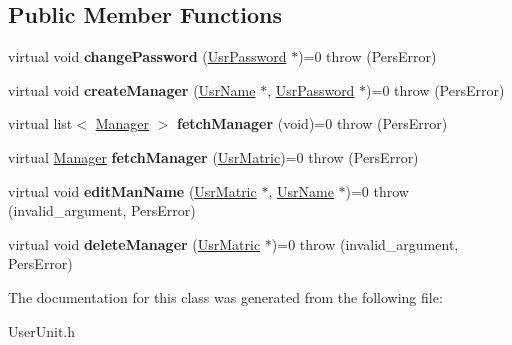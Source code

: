 \subsection*{Public Member Functions}
\begin{DoxyCompactItemize}
\item 
\hypertarget{classUserManAdm_a75006ea396a6384bbf47918fe9316bce}{virtual void {\bfseries change\-Password} (\hyperlink{classUsrPassword}{Usr\-Password} $\ast$)=0  throw (\-Pers\-Error)}\label{da/d86/classUserManAdm_a75006ea396a6384bbf47918fe9316bce}

\item 
\hypertarget{classUserManAdm_a4c1d61e8190867eb786cdf97083ba289}{virtual void {\bfseries create\-Manager} (\hyperlink{classUsrName}{Usr\-Name} $\ast$, \hyperlink{classUsrPassword}{Usr\-Password} $\ast$)=0  throw (\-Pers\-Error)}\label{da/d86/classUserManAdm_a4c1d61e8190867eb786cdf97083ba289}

\item 
\hypertarget{classUserManAdm_a05b8b4f5b1e42b7b9f77d6a40b90dbb2}{virtual list$<$ \hyperlink{classManager}{Manager} $>$ {\bfseries fetch\-Manager} (void)=0  throw (\-Pers\-Error)}\label{da/d86/classUserManAdm_a05b8b4f5b1e42b7b9f77d6a40b90dbb2}

\item 
\hypertarget{classUserManAdm_a62e826d1c11061df021016e94e88f9ba}{virtual \hyperlink{classManager}{Manager} {\bfseries fetch\-Manager} (\hyperlink{classUsrMatric}{Usr\-Matric})=0  throw (\-Pers\-Error)}\label{da/d86/classUserManAdm_a62e826d1c11061df021016e94e88f9ba}

\item 
\hypertarget{classUserManAdm_a0440de1c9d712a8dac1aa4e526d0fe9b}{virtual void {\bfseries edit\-Man\-Name} (\hyperlink{classUsrMatric}{Usr\-Matric} $\ast$, \hyperlink{classUsrName}{Usr\-Name} $\ast$)=0  throw (invalid\-\_\-argument, Pers\-Error)}\label{da/d86/classUserManAdm_a0440de1c9d712a8dac1aa4e526d0fe9b}

\item 
\hypertarget{classUserManAdm_a3fd6ddb6b71743fe5ece3100206023c3}{virtual void {\bfseries delete\-Manager} (\hyperlink{classUsrMatric}{Usr\-Matric} $\ast$)=0  throw (invalid\-\_\-argument, Pers\-Error)}\label{da/d86/classUserManAdm_a3fd6ddb6b71743fe5ece3100206023c3}

\end{DoxyCompactItemize}


The documentation for this class was generated from the following file\-:\begin{DoxyCompactItemize}
\item 
User\-Unit.\-h\end{DoxyCompactItemize}
